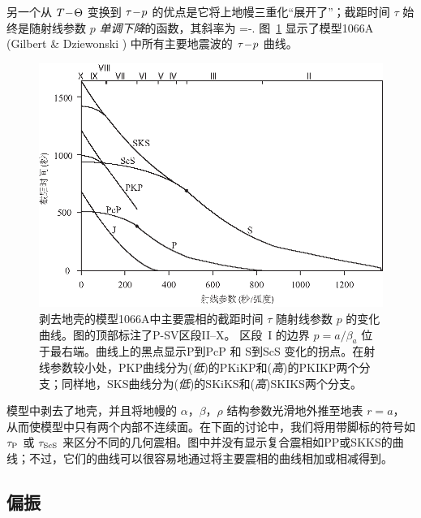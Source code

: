 另一个从 $T\hspace{-0.7 mm}-\!\Theta$ 变换到 $\tau\hspace{-0.6 mm}-\!p$ 的优点是它将上地幔三重化“展开了”；截距时间 $\tau$ 始终是随射线参数 $p$ {\em 单调下降\/}的函数，其斜率为
\eq \label{12.tauder}
=-\Theta.
\en
图~\ref{12.fig.zhao15} 显示了模型1066A
(Gilbert \& Dziewonski \citeyear{gilbert&dziewonski75}) 中所有主要地震波的 $\tau\hspace{-0.6 mm}-\!p$ 曲线。
\begin{figure}[!t]
\begin{center}
\includegraphics{../figures/chap12/fig04.eps}
\end{center}
\caption[taup1066A]{\label{12.fig.zhao15}
剥去地壳的模型1066A中主要震相的截距时间
$\tau $ 随射线参数 $p$ 的变化曲线。图的顶部标注了P-SV区段II--X。
区段~I 的边界 $p=a/\beta_a$ 位于最右端。曲线上的黑点显示P到PcP 和 S到ScS 变化的拐点。在射线参数较小处，PKP曲线分为({\em 低\/})的PKiKP和({\em 高\/})的PKIKP两个分支；同样地，SKS曲线分为({\em 低\/})的SKiKS和({\em 高\/})SKIKS两个分支。}
\end{figure}
模型中剥去了地壳，并且将地幔的 $\alpha$，$\beta$，$\rho$ 结构参数光滑地外推至地表 $r=a$，从而使模型中只有两个内部不连续面。在下面的讨论中，我们将用带脚标的符号如 $\tau_{\rm P}$ 或 $\tau_{\rm ScS}$ 来区分不同的几何震相。图中并没有显示复合震相如PP或SKKS的曲线；不过，它们的曲线可以很容易地通过将主要震相的曲线相加或相减得到。
%

\subsection{偏振}
%
%
\label{12.sec.polar}

